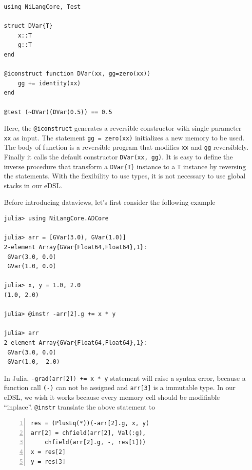 \documentclass[aps,twocolumn,longbibliography,english,superscriptaddress]{revtex4-1}
\newcommand{\<}{\langle}
\renewcommand{\>}{\rangle}
\theoremstyle{definition}\newtheorem{definition}{\textit{Definition}}
\begin{document}
\begin{minipage}{.44\textwidth}
\begin{lstlisting}
using NiLangCore, Test

struct DVar{T}
    x::T
    g::T
end

@iconstruct function DVar(xx, gg=zero(xx))
    gg += identity(xx)
end

@test (~DVar)(DVar(0.5)) == 0.5
\end{lstlisting}
\end{minipage}

Here, the \texttt{@iconstruct} generates a reversible constructor with single parameter \texttt{xx} as input. The statement \texttt{gg = zero(xx)} initializes a new memory to be used. The body of function is a reversible program that modifies \texttt{xx} and \texttt{gg} reversiblely. Finally it calls the default constructor \texttt{DVar(xx, gg)}. It is easy to define the inverse procedure that transform a \texttt{DVar\{T\}} instance to a \texttt{T} instance by reversing the statements. With the flexibility to use types, it is not necessary to use global stacks in our eDSL.

Before introducing dataviews, let's first consider the following example

\begin{minipage}{.44\textwidth}
\begin{lstlisting}
julia> using NiLangCore.ADCore

julia> arr = [GVar(3.0), GVar(1.0)]
2-element Array{GVar{Float64,Float64},1}:
 GVar(3.0, 0.0)
 GVar(1.0, 0.0)

julia> x, y = 1.0, 2.0
(1.0, 2.0)

julia> @instr -arr[2].g += x * y

julia> arr
2-element Array{GVar{Float64,Float64},1}:
 GVar(3.0, 0.0)
 GVar(1.0, -2.0)
\end{lstlisting}
\end{minipage}

In Julia, \texttt{-grad(arr[2]) += x * y} statement will raise a syntax error, because a function call \texttt{(-)} can not be assigned and \texttt{arr[3]} is a immutable type.
In our eDSL, we wish it works because every memory cell should be modifiable ``inplace''.
\texttt{@instr} translate the above statement to

\begin{minipage}{.44\textwidth}
    \begin{lstlisting}[numberstyle=\scriptsize\color{gray},numbers=left,numbersep=8pt]
res = (PlusEq(*))(-arr[2].g, x, y)
arr[2] = chfield(arr[2], Val(:g),
    chfield(arr[2].g, -, res[1]))
x = res[2]
y = res[3]
\end{lstlisting}
\end{minipage}
\end{document}
